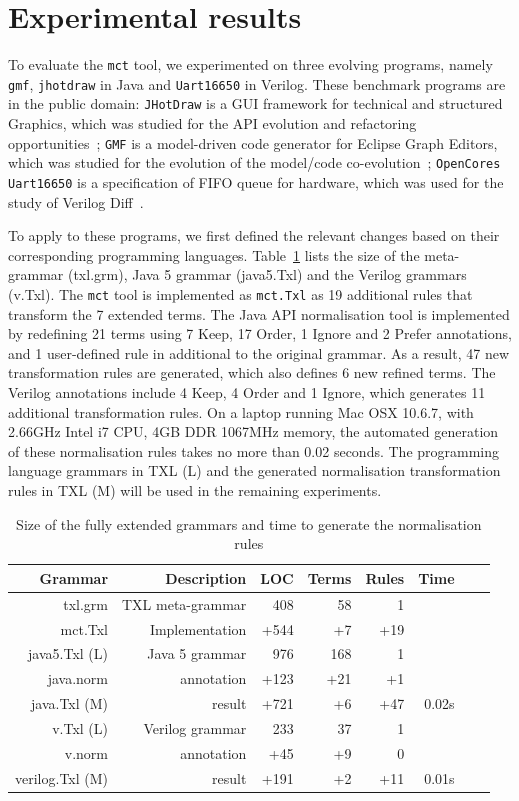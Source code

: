 \documentclass[10pt, conference, compsocconf]{IEEEtran}
\begin{document}
{\section{Experimental results}\label{sec:experiment}
To evaluate the {\tt mct} tool, we experimented on three evolving programs, namely {\tt gmf}, {\tt jhotdraw} in Java and {\tt Uart16650} in Verilog. These benchmark programs are in the public domain: {\tt JHotDraw} is a  GUI framework for technical and structured Graphics, which was studied for the API evolution and refactoring opportunities~\cite{DBLP:journals/smr/DigJ06}; {\tt GMF} is a model-driven code generator for Eclipse Graph Editors, which was  studied for the evolution of the model/code co-evolution~\cite{DBLP:conf/sle/HerrmannsdoerferRW09}; {\tt OpenCores Uart16650} is a specification of FIFO queue for hardware, which was used for the study of Verilog Diff~\cite{Duley:2010:PDA:1858996.1859093}.

To apply to these programs, we first defined the relevant changes based on their corresponding programming languages. Table~\ref{table:2} lists the size of the meta-grammar (txl.grm), Java 5 grammar (java5.Txl) and the Verilog grammars (v.Txl). The {\tt mct} tool is implemented as {\tt mct.Txl} as 19 additional rules that transform the 7 extended terms. The Java API normalisation tool is implemented by redefining 21 terms using 7 Keep, 17 Order, 1 Ignore and 2 Prefer annotations, and 1 user-defined rule in additional to the original grammar. As a result, 47 new transformation rules are generated, which also defines 6 new refined terms. The Verilog annotations include 4 Keep, 4 Order and 1 Ignore, which generates 11 additional transformation rules. On a laptop running Mac OSX 10.6.7, with 2.66GHz Intel i7 CPU, 4GB DDR 1067MHz memory, the automated generation of these normalisation rules takes no more than 0.02 seconds. The programming language grammars in TXL (L) and the generated normalisation transformation rules in TXL (M) will be used in the remaining experiments.
\begin{table}\centering
\caption{Size of the fully extended grammars and time to generate the normalisation rules\label{table:2}}
\begin{tabular}{| r || r | r | r | r |  r |  r |  r  |}\hline
\bf Grammar & \bf Description &\bf  LOC &\bf  Terms &\bf   Rules &\bf  Time \\  \hline\hline
txl.grm & TXL meta-grammar & 408 & 58 & 1  &\\
mct.Txl & Implementation & +544 & +7 & +19 &\\ \hline
java5.Txl (L)& Java 5 grammar &  976 & 168 & 1 &\\
java.norm & annotation & +123 & +21 & +1 &\\ 
java.Txl (M)& result & +721  & +6 & +47  & 0.02s\\\hline  
v.Txl (L)& Verilog grammar & 233 &  37 &  1 &\\
v.norm & annotation & +45 & +9 & 0 &\\
verilog.Txl (M)& result & +191 &  +2 & +11 & 0.01s\\\hline
\hline\end{tabular}
\end{table}

}
\end{document}
